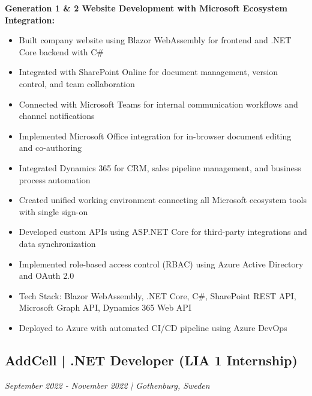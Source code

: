 \documentclass[11pt,a4paper]{article}
\begin{document}
\textbf{Generation 1 \& 2 Website Development with Microsoft Ecosystem Integration:}
\begin{itemize}[leftmargin=*, itemsep=2pt]
\item Built company website using Blazor WebAssembly for frontend and .NET Core backend with C\#
\item Integrated with SharePoint Online for document management, version control, and team collaboration
\item Connected with Microsoft Teams for internal communication workflows and channel notifications
\item Implemented Microsoft Office integration for in-browser document editing and co-authoring
\item Integrated Dynamics 365 for CRM, sales pipeline management, and business process automation
\item Created unified working environment connecting all Microsoft ecosystem tools with single sign-on
\item Developed custom APIs using ASP.NET Core for third-party integrations and data synchronization
\item Implemented role-based access control (RBAC) using Azure Active Directory and OAuth 2.0
\item Tech Stack: Blazor WebAssembly, .NET Core, C\#, SharePoint REST API, Microsoft Graph API, Dynamics 365 Web API
\item Deployed to Azure with automated CI/CD pipeline using Azure DevOps
\end{itemize}

\subsection*{AddCell | .NET Developer (LIA 1 Internship)}
\textit{September 2022 - November 2022 | Gothenburg, Sweden}
\end{document}
